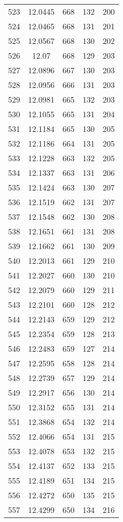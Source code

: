 \documentclass[12pt,a4paper]{article}
\begin{document}
\begin{tabular}{r|cccc}
	523 & 12.0445 & 668 & 132 & 200 \\
	524 & 12.0465 & 668 & 131 & 201 \\
	525 & 12.0567 & 668 & 130 & 202 \\
	526 & 12.07 & 668 & 129 & 203 \\
	527 & 12.0896 & 667 & 130 & 203 \\
	528 & 12.0956 & 666 & 131 & 203 \\
	529 & 12.0981 & 665 & 132 & 203 \\
	530 & 12.1055 & 665 & 131 & 204 \\
	531 & 12.1184 & 665 & 130 & 205 \\
	532 & 12.1186 & 664 & 131 & 205 \\
	533 & 12.1228 & 663 & 132 & 205 \\
	534 & 12.1337 & 663 & 131 & 206 \\
	535 & 12.1424 & 663 & 130 & 207 \\
	536 & 12.1519 & 662 & 131 & 207 \\
	537 & 12.1548 & 662 & 130 & 208 \\
	538 & 12.1651 & 661 & 131 & 208 \\
	539 & 12.1662 & 661 & 130 & 209 \\
	540 & 12.2013 & 661 & 129 & 210 \\
	541 & 12.2027 & 660 & 130 & 210 \\
	542 & 12.2079 & 660 & 129 & 211 \\
	543 & 12.2101 & 660 & 128 & 212 \\
	544 & 12.2143 & 659 & 129 & 212 \\
	545 & 12.2354 & 659 & 128 & 213 \\
	546 & 12.2483 & 659 & 127 & 214 \\
	547 & 12.2595 & 658 & 128 & 214 \\
	548 & 12.2739 & 657 & 129 & 214 \\
	549 & 12.2917 & 656 & 130 & 214 \\
	550 & 12.3152 & 655 & 131 & 214 \\
	551 & 12.3868 & 654 & 132 & 214 \\
	552 & 12.4066 & 654 & 131 & 215 \\
	553 & 12.4078 & 653 & 132 & 215 \\
	554 & 12.4137 & 652 & 133 & 215 \\
	555 & 12.4189 & 651 & 134 & 215 \\
	556 & 12.4272 & 650 & 135 & 215 \\
	557 & 12.4299 & 650 & 134 & 216 \\

\end{tabular}
\end{document}
